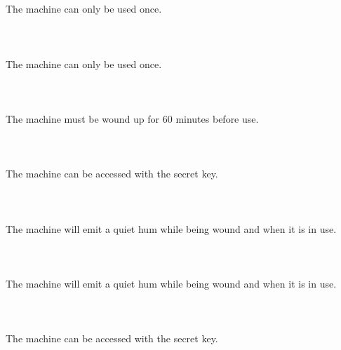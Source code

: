 \documentclass{article}
\begin{document}
    \section{}
    The machine can only be used once.\\\\ 
    \newpage
    
    \section{}
    The machine can only be used once.\\\\ 
    \newpage
    
    \section{}
    The machine must be wound up for 60 minutes before use.\\\\ 
    \newpage
    
    \section{}
    The machine can be accessed with the secret key.\\\\ 
    \newpage
    
    \section{}
    The machine will emit a quiet hum while being wound and when it is in use.\\\\ 
    \newpage
    
    \section{}
    The machine will emit a quiet hum while being wound and when it is in use.\\\\ 
    \newpage
    
    \section{}
    The machine can be accessed with the secret key.\\\\ 
    \newpage
    
\end{document}
